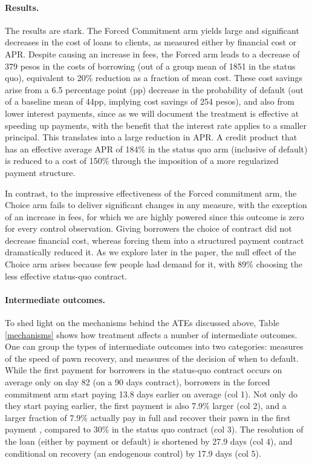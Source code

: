 \documentclass[oneside,11pt]{article}
\begin{document}
\paragraph{Results.} The results are stark. The Forced Commitment arm yields large and significant decreases in the cost of loans to clients, as measured either by financial cost or APR. Despite causing an increase in fees, the Forced arm leads to a decrease of 379 pesos in the costs of borrowing (out of a group mean of 1851 in the status quo), equivalent to 20\% reduction as a fraction of mean cost. These cost savings arise from a 6.5 percentage point (pp) decrease in the probability of default (out of a baseline mean of 44pp,  implying cost savings of 254 pesos), and also from lower interest payments, since as we will document the treatment is effective at speeding up payments, with the benefit that the interest rate applies to a smaller principal. This translates into a large reduction in APR. A credit product that has an effective average APR of 184\% in the status quo arm (inclusive of default) is reduced to a cost of 150\% through the imposition of a more regularized payment structure.  

In contrast, to the impressive effectiveness of the Forced commitment arm, the Choice arm fails to deliver significant changes in any measure, with the exception of an increase in fees, for which we are highly powered since this outcome is zero for every control observation. Giving borrowers the choice of contract did not decrease financial cost, whereas forcing them into a structured payment contract dramatically reduced it. As we explore later in the paper, the null effect of the Choice arm arises because few people had demand for it, with 89\% choosing the less effective status-quo contract.

\paragraph{Intermediate outcomes.} To shed light on the mechanisms behind the ATEs discussed above, Table \ref{mechanisms} shows how treatment affects a number of intermediate outcomes. One can group the types of intermediate outcomes into two categories: measures of the speed of pawn recovery, and measures of the decision of when to default. While the first payment for borrowers in the status-quo contract occurs on average only on day 82 (on a 90 days contract), borrowers in the forced commitment arm start paying 13.8 days earlier on average (col 1). Not only do they start paying earlier, the first payment is also 7.9\% larger (col 2), and a larger fraction of 7.9\% actually pay in full and recover their pawn in the first payment , compared to 30\% in the status quo contract (col 3). The resolution of the loan (either by payment or default) is shortened by 27.9 days (col 4), and conditional on recovery (an endogenous control) by 17.9 days (col 5).
\end{document}
